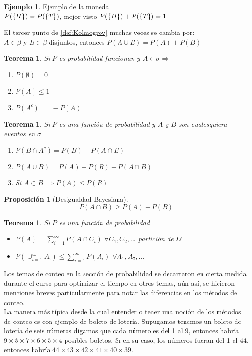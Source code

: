 \documentclass[11pt,a4paper,oneside]{report}
\theoremstyle{definition}
\newtheorem{ejemplo}[definicion]{Ejemplo}
\theoremstyle{plain}
\newtheorem{teorema}[definicion]{Teorema}
\newtheorem{proposicion}[definicion]{Proposición}
\theoremstyle{remark}
\DeclarePairedDelimiter{\conj}{\{}{\}}
\begin{document}
\begin{ejemplo}
  Ejemplo de la moneda \\
  $P(\conj{H})=P(\conj{T})$, mejor visto $P(\conj{H})+P(\conj{T})=1$ 
\end{ejemplo}

El tercer punto de \cref{def:Kolmogrov} muchas veces se cambia por: \\
$A \in \beta$ y $B \in \beta $ disjuntos, entonces $P(A \cup B)=P(A)+P(B)$

\begin{teorema}
  Si $P$ es probabilidad funcionan y $A \in \sigma \Rightarrow$
  \begin{enumerate}
    \item $P(\emptyset)=0$
    \item $P(A)\leq 1$
    \item $P(A^{c})=1-P(A)$
  \end{enumerate}
\end{teorema}

\begin{teorema}
  Si $P$ es una función de probabilidad y $A$ y $B$ son cualesquiera eventos 
    en $\sigma$
    \begin{enumerate}
        \item $P(B \cap A^{c})=P(B)-P(A \cap B)$
        \item $P(A\cup B) = P(A) + P(B) -P(A\cap B)$
        \item Si $A \subset B$ $\Rightarrow P(A) \leq P(B)$ 
    \end{enumerate}
\end{teorema}

\begin{proposicion}[Desigualdad Bayesiana]
  \[ P(A \cap B) \geq P(A)+P(B)\]
\end{proposicion}

\begin{teorema}
  Si $P$ es una función de probabilidad
        \begin{itemize}
            \item $P(A)=\sum_{i=1}^{\infty} P(A\cap C_{i})$ 
            $ \forall C_{1},C_{2},...$ partición de $\Omega$
            \item $P(\cup_{i=1}^{\infty}A_{i})\leq\sum_{i=1}^{\infty} P(A_{i})$ $\forall A_1, A_2,...$
        \end{itemize}
\end{teorema}

Los temas de conteo en la sección de probabilidad se decartaron en cierta medida durante el curso para
optimizar el tiempo en otros temas, aún así, se hicieron menciones breves particularmente para notar las diferencias 
en los métodos de conteo.\\
La manera más típica desde la cual entender o tener una noción de los métodos de conteo es con ejemplo de boleto
de lotería. Supugamos tenemos un boleto de lotería de seis números digamos que cada número es del 1 al 9,
entonces habría $9 \times 8 \times 7 \times 6 \times 5 \times 4$ posibles boletos. Si en su caso, los números 
fueran del 1 al 44, entonces habría $44 \times 43 \times 42 \times 41 \times 40 \times 39$.
\end{document}
